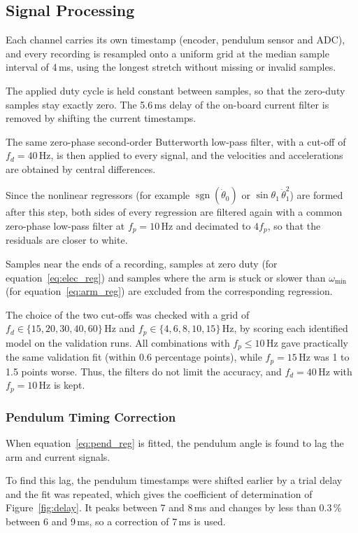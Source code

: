 \documentclass[a4paper,11pt]{article}
\newcommand{\sgn}{\operatorname{sgn}}
\begin{document}
\subsection{Signal Processing}
\label{sec:processing}
Each channel carries its own timestamp (encoder, pendulum sensor and ADC), and every recording is resampled onto a uniform grid at the median sample interval of 4\,ms, using the longest stretch without missing or invalid samples.

The applied duty cycle is held constant between samples, so that the zero-duty samples stay exactly zero. The 5.6\,ms delay of the on-board current filter is removed by shifting the current timestamps.

The same zero-phase second-order Butterworth low-pass filter, with a cut-off of $f_d = 40\,\mathrm{Hz}$, is then applied to every signal, and the velocities and accelerations are obtained by central differences.

Since the nonlinear regressors (for example $\sgn(\dot\theta_0)$ or $\sin\theta_1\,\dot\theta_1^2$) are formed after this step, both sides of every regression are filtered again with a common zero-phase low-pass filter at $f_p = 10\,\mathrm{Hz}$ and decimated to $4 f_p$, so that the residuals are closer to white.

Samples near the ends of a recording, samples at zero duty (for equation~\ref{eq:elec_reg}) and samples where the arm is stuck or slower than $\omega_{\min}$ (for equation~\ref{eq:arm_reg}) are excluded from the corresponding regression.

The choice of the two cut-offs was checked with a grid of $f_d \in \{15, 20, 30, 40, 60\}\,\mathrm{Hz}$ and $f_p \in \{4, 6, 8, 10, 15\}\,\mathrm{Hz}$, by scoring each identified model on the validation runs. All combinations with $f_p \le 10\,\mathrm{Hz}$ gave practically the same validation fit (within 0.6 percentage points), while $f_p = 15\,\mathrm{Hz}$ was 1 to 1.5 points worse. Thus, the filters do not limit the accuracy, and $f_d = 40\,\mathrm{Hz}$ with $f_p = 10\,\mathrm{Hz}$ is kept.

\subsubsection{Pendulum Timing Correction}
When equation~\ref{eq:pend_reg} is fitted, the pendulum angle is found to lag the arm and current signals.

To find this lag, the pendulum timestamps were shifted earlier by a trial delay and the fit was repeated, which gives the coefficient of determination of Figure~\ref{fig:delay}. It peaks between 7 and 8\,ms and changes by less than 0.3\,\% between 6 and 9\,ms, so a correction of 7\,ms is used.
\end{document}
